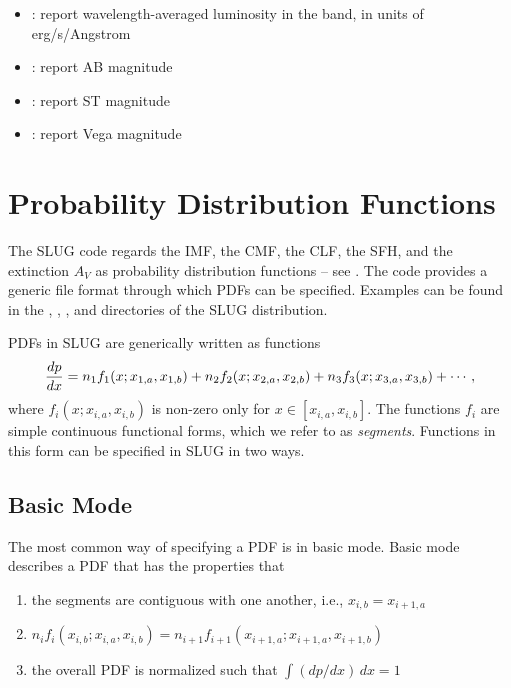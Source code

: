 \documentclass[letterpaper,10pt,english]{sphinxmanual}
\begin{document}
\begin{itemize}
\begin{description}
\begin{itemize}
\item {} 
: report wavelength-averaged luminosity in the band, in units of erg/s/Angstrom

\item {} 
: report AB magnitude

\item {} 
: report ST magnitude

\item {} 
: report Vega magnitude

\end{itemize}

\end{description}

\end{itemize}


\chapter{Probability Distribution Functions}
\label{pdfs:probability-distribution-functions}\label{pdfs::doc}\label{pdfs:sec-pdfs}
The SLUG code regards the IMF, the CMF, the CLF, the SFH, and the extinction \(A_V\) as probability distribution functions -- see {\hyperref[intro:ssec-slugpdfs]{\emph{}}}. The code provides a generic file format through which PDFs can be specified. Examples can be found in the , , , and  directories of the SLUG distribution.

PDFs in SLUG are generically written as functions
\begin{gather}
\begin{split}\frac{dp}{dx} = n_1 f_1(x; x_{1,a}, x_{1,b}) + n_2 f_2(x; x_{2,a}, x_{2,b}) + n_3 f_3(x; x_{3,a}, x_{3,b}) + \cdots,\end{split}\notag
\end{gather}
where \(f_i(x; x_{i,a}, x_{i,b})\) is non-zero only for \(x \in [x_{i,a}, x_{i,b}]\). The functions \(f_i\) are simple continuous functional forms, which we refer to as \emph{segments}. Functions in this form can be specified in SLUG in two ways.


\section{Basic Mode}
\label{pdfs:basic-mode}
The most common way of specifying a PDF is in basic mode. Basic mode describes a PDF that has the properties that
\begin{enumerate}
\item {} 
the segments are contiguous with one another, i.e., \(x_{i,b} = x_{i+1,a}\)

\item {} 
\(n_i f_i(x_{i,b}; x_{i,a}, x_{i,b}) = n_{i+1} f_{i+1}(x_{i+1,a}; x_{i+1,a}, x_{i+1,b})\)

\item {} 
the overall PDF is normalized such that \(\int (dp/dx)\, dx = 1\)

\end{enumerate}
\end{document}
